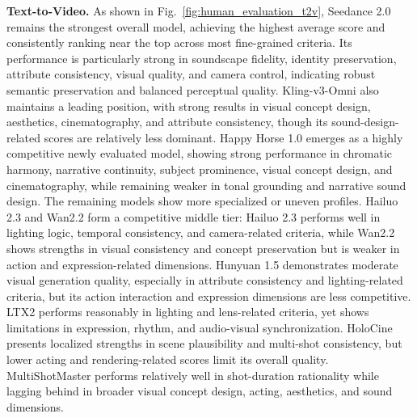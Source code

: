 \documentclass{article}
\begin{document}
\noindent
\textbf{Text-to-Video.} As shown in Fig.~\ref{fig:human_evaluation_t2v}, Seedance 2.0 remains the strongest overall model, achieving the highest average score and consistently ranking near the top across most fine-grained criteria. Its performance is particularly strong in soundscape fidelity, identity preservation, attribute consistency, visual quality, and camera control, indicating robust semantic preservation and balanced perceptual quality. Kling-v3-Omni also maintains a leading position, with strong results in visual concept design, aesthetics, cinematography, and attribute consistency, though its sound-design-related scores are relatively less dominant. Happy Horse 1.0 emerges as a highly competitive newly evaluated model, showing strong performance in chromatic harmony, narrative continuity, subject prominence, visual concept design, and cinematography, while remaining weaker in tonal grounding and narrative sound design. The remaining models show more specialized or uneven profiles. Hailuo 2.3 and Wan2.2 form a competitive middle tier: Hailuo 2.3 performs well in lighting logic, temporal consistency, and camera-related criteria, while Wan2.2 shows strengths in visual consistency and concept preservation but is weaker in action and expression-related dimensions. Hunyuan 1.5 demonstrates moderate visual generation quality, especially in attribute consistency and lighting-related criteria, but its action interaction and expression dimensions are less competitive. LTX2 performs reasonably in lighting and lens-related criteria, yet shows limitations in expression, rhythm, and audio-visual synchronization. HoloCine presents localized strengths in scene plausibility and multi-shot consistency, but lower acting and rendering-related scores limit its overall quality. MultiShotMaster performs relatively well in shot-duration rationality while lagging behind in broader visual concept design, acting, aesthetics, and sound dimensions.
\end{document}
